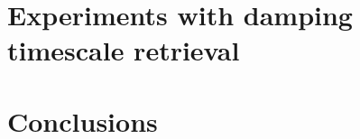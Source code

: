 \documentclass[fleqn,usenatbib]{mnras}  %
\begin{document}




\section{Experiments with damping timescale retrieval }




\section{Conclusions}










\bsp	%
\label{lastpage}
\end{document}
